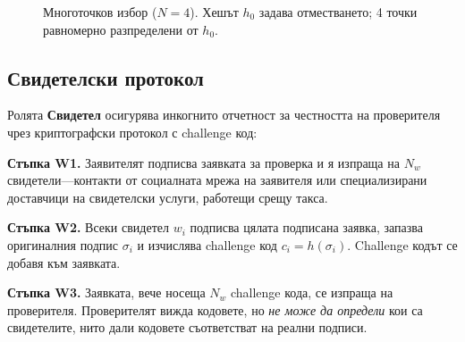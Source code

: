 \documentclass[11pt,a4paper,twocolumn]{article}
\begin{document}
\begin{figure}[ht]
\centering
{}
\caption{Многоточков избор ($N{=}4$). Хешът $h_0$ задава отместването; 4 точки равномерно разпределени от $h_0$.}
\label{fig:multipoint}
\end{figure}

\subsection{Свидетелски протокол}

Ролята \textbf{Свидетел} осигурява инкогнито отчетност за честността на проверителя чрез криптографски протокол с challenge код:

\textbf{Стъпка W1.} Заявителят подписва заявката за проверка и я изпраща на $N_w$ свидетели---контакти от социалната мрежа на заявителя или специализирани доставчици на свидетелски услуги, работещи срещу такса.

\textbf{Стъпка W2.} Всеки свидетел $w_i$ подписва цялата подписана заявка, запазва оригиналния подпис $\sigma_i$ и изчислява challenge код $c_i = h(\sigma_i)$. Challenge кодът се добавя към заявката.

\textbf{Стъпка W3.} Заявката, вече носеща $N_w$ challenge кода, се изпраща на проверителя. Проверителят вижда кодовете, но \emph{не може да определи} кои са свидетелите, нито дали кодовете съответстват на реални подписи.
\end{document}
